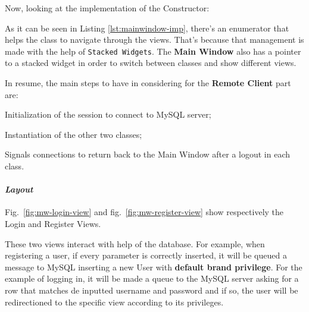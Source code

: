 Now, looking at the implementation of the Constructor:

%

As it can be seen in Listing \ref{lst:mainwindow-imp}, there's an enumerator that helps the class to navigate through the views.
That's because that management is made with the help of \texttt{Stacked Widgets}.
The \textbf{Main Window} also has a pointer to a stacked widget in order to switch between classes and show different views.

In resume, the main steps to have in considering for the \textbf{Remote Client} part are:
\begin{item-c}
\item Initialization of the session to connect to MySQL server;
\item Instantiation of the other two classes;
\item Signals connections to return back to the Main Window after a logout in each class. 
\end{item-c}

\paragraph{\emph{Layout}}
Fig.~\ref{fig:mw-login-view} and fig.~\ref{fig:mw-register-view} show respectively the Login and Register Views.

These two views interact with help of the database. 
For example, when registering a user, if every parameter is correctly inserted, it will be queued a message to MySQL inserting a new User with \textbf{default brand privilege}.
For the example of logging in, it will be made a queue to the MySQL server asking for a row that matches de inputted username and password and if so, the user will be redirectioned to the specific view according to its privileges.

